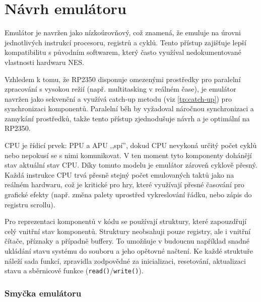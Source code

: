 \chapter{Návrh emulátoru}



Emulátor je navržen jako nízkoúrovňový, což znamená, že emuluje na úrovni jednotlivých
instrukcí procesoru, registrů a cyklů. Tento přístup zajišťuje lepší kompatibilitu s původním
softwarem, který často využíval nedokumentované vlastnosti hardwaru NES.

Vzhledem k tomu, že RP2350 disponuje omezenými prostředky pro paralelní zpracování s vysokou režií
(např. multitasking v reálném čase), je emulátor navržen jako sekvenční a využívá catch-up metodu
(viz \ref{tp:catch-up}) pro synchronizaci komponentů. Paralelní běh by vyžadoval náročnou
synchronizaci a zamykání prostředků, takže tento přístup zjednodušuje návrh a je optimální
na RP2350.

CPU je řídicí prvek: PPU a APU ,,spí'', dokud CPU nevykoná určitý počet cyklů nebo
nepokusí se s nimi komunikovat. V ten moment tyto komponenty dohánějí stav aktuální stav CPU. Díky
tomuto modelu je emulátor zároveň cyklově přesný. Každá instrukce CPU trvá přesně stejný počet
emulovaných taktů jako na reálném hardwaru, což je kritické pro hry, které využívají přesné časování
pro grafické efekty (např. změna palety uprostřed vykreslování řádku, nebo zápis do registru
scrollu).

Pro reprezentaci komponentů v kódu se používají struktury, které zapouzdřují celý vnitřní stav
komponentů. Struktury neobsahuji pouze registry, ale i vnitřní čítače, příznaky a případně buffery.
To umožňuje v budoucnu například snadné ukládání stavu systému do souboru a jeho opětovné načtení.
Ke každé struktuře náleží sada funkcí, zpravidla zodpovědné za inicializaci, resetování,
aktualizaci stavu a sběrnicové funkce (\texttt{read()}/\texttt{write()}).

\subsection{Smyčka emulátoru}

